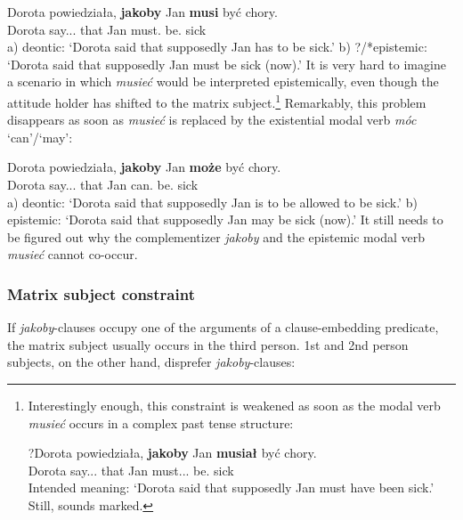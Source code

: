 \documentclass[output=paper
,modfonts
,nonflat]{langsci/langscibook}
\begin{document}
\ea \gll Dorota powiedziała, \textbf{jakoby} Jan \textbf{musi} być chory. \\
		Dorota say.{\lptcp}.{\sg}.{\fem} that Jan must.{\thirdperson}{\sg} be.{\infv} sick \\
\glt	a) deontic: `Dorota said that supposedly Jan has to be sick.' 
\glt	b) ?/*epistemic: `Dorota said that supposedly Jan must be sick (now).'
\z
It is very hard to imagine a scenario in which \emph{musieć} would be interpreted epistemically, even though the attitude holder has shifted to the matrix subject.\footnote{Interestingly enough, this constraint is weakened as soon as the modal verb \emph{musieć} occurs in a complex past tense structure:

\ea \gll ?Dorota powiedziała, \textbf{jakoby} Jan \textbf{musiał} być chory. \label{bluh} \\
		Dorota say.{\lptcp}.{\sg}.{\fem} that Jan must.{\lptcp}.{\sg}.{\masc} be.{\infv} sick \\
\glt	Intended meaning: `Dorota said that supposedly Jan must have been sick.'
\z
Still,  sounds marked. 
}
 Remarkably, this problem disappears as soon as \emph{musieć} is replaced by the existential modal verb \emph{móc} `can'\slash `may':

\ea \gll Dorota powiedziała, \textbf{jakoby} Jan \textbf{może} być chory. \\
		Dorota say.{\lptcp}.{\sg}.{\fem} that Jan can.{\thirdperson}{\sg} be.{\infv} sick \\
\glt	a) deontic: `Dorota said that supposedly Jan is to be allowed to be sick.' 
\glt	b) epistemic: `Dorota said that supposedly Jan may be sick (now).'
\z
It still needs to be figured out why the complementizer \emph{jakoby} and the epistemic modal verb \emph{musieć} cannot co-occur.

\subsubsection{Matrix subject constraint}
If \emph{jakoby}-clauses occupy one of the arguments of a clause-embedding predicate, the matrix subject usually occurs in the third person. 1st and 2nd person subjects, on the other hand, disprefer \emph{jakoby}-clauses:
\end{document}
